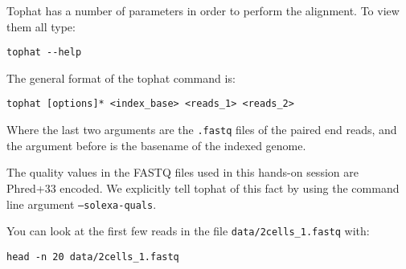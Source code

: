 \begin{steps}
Tophat has a number of parameters in order to perform the alignment. To view them all type:
\begin{lstlisting}
tophat --help
\end{lstlisting}
\end{steps}

\begin{information}
The general format of the tophat command is:
\begin{lstlisting}[style=command_syntax]
tophat [options]* <index_base> <reads_1> <reads_2>
\end{lstlisting}

Where the last two arguments are the \texttt{.fastq} files of the paired end
reads, and the argument before is the basename of the indexed genome.
\end{information}

\begin{note}
The quality values in the FASTQ files used in this hands-on session are Phred+33
encoded. We explicitly tell tophat of this fact by using the command line
argument \texttt{--solexa-quals}.
\end{note}

\begin{information}
You can look at the first few reads in the file \texttt{data/2cells\_1.fastq} with:
 
\begin{lstlisting}
head -n 20 data/2cells_1.fastq
\end{lstlisting}
\end{information}


